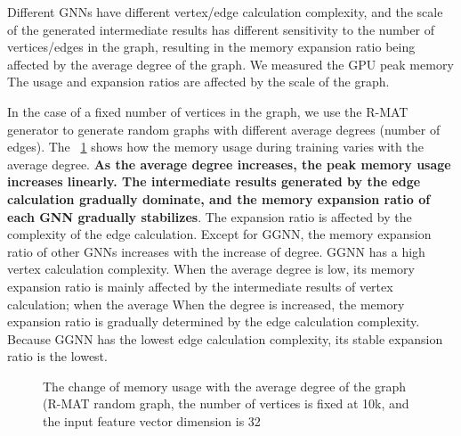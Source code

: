 Different GNNs have different vertex/edge calculation complexity, and the scale of the generated intermediate results has different sensitivity
to the number of vertices/edges in the graph, resulting in the memory expansion ratio being affected by the average degree of the graph.
We measured the GPU peak memory The usage and expansion ratios are affected by the scale of the graph.

In the case of a fixed number of vertices in the graph, we use the R-MAT generator to generate random graphs with different average degrees (number of edges).
The \figurename~\ref{fig:exp_memory_expansion_ratio_input_graph_number_of_edges} shows how the memory usage during training varies with the average degree.
\textbf{As the average degree increases, the peak memory usage increases linearly.
    The intermediate results generated by the edge calculation gradually dominate, and the memory expansion ratio of each GNN gradually stabilizes}.
The expansion ratio is affected by the complexity of the edge calculation.
Except for GGNN, the memory expansion ratio of other GNNs increases with the increase of degree. GGNN has a high vertex calculation complexity.
When the average degree is low, its memory expansion ratio is mainly affected by the intermediate results of vertex calculation;
when the average When the degree is increased, the memory expansion ratio is gradually determined by the edge calculation complexity.
Because GGNN has the lowest edge calculation complexity, its stable expansion ratio is the lowest.

\begin{figure}
    \centering
    \caption{The change of memory usage with the average degree of the graph (R-MAT random graph, the number of vertices is fixed at 10k, and the input feature vector dimension is 32}
    \label{fig:exp_memory_expansion_ratio_input_graph_number_of_edges}
\end{figure}

